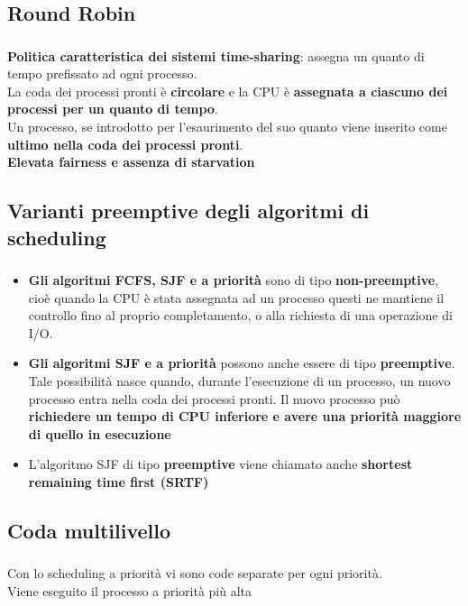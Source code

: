 \documentclass{beamer}
\newenvironment{mainframe}{
	\begin{frame}
		\frametitle{\insertsubsection}
		\framesubtitle{\insertsection}
	}{
	\end{frame}
}
\begin{document}
\subsection{Round Robin}
\begin{mainframe}
	\textbf{Politica caratteristica dei sistemi \textbf{time-sharing}}: assegna un quanto di tempo prefissato ad ogni processo.\\
	La coda dei processi pronti è \textbf{circolare} e la CPU è \textbf{assegnata a ciascuno dei processi per un quanto di tempo}.\\
	Un processo, se introdotto per l'esaurimento del suo quanto viene inserito come \textbf{ultimo nella coda dei processi pronti}.\\
	\textbf{Elevata fairness e assenza di starvation}
\end{mainframe}
\subsection{Varianti preemptive degli algoritmi di scheduling}
\begin{mainframe}
	\begin{itemize}
		\item \textbf{Gli algoritmi FCFS, SJF e a priorità} sono di tipo \textbf{non-preemptive}, cioè quando la CPU è stata assegnata ad un processo questi ne mantiene il controllo fino al proprio completamento, o alla richiesta di una operazione di I/O.
		\item \textbf{Gli algoritmi SJF e a priorità} possono anche essere di tipo \textbf{preemptive}. Tale possibilità nasce quando, durante l'esecuzione di un processo, un nuovo processo entra nella coda dei processi pronti. Il nuovo processo può \textbf{richiedere un tempo di CPU inferiore e avere una priorità maggiore di quello in esecuzione}
		\item L'algoritmo SJF di tipo \textbf{preemptive} viene chiamato anche \textbf{shortest remaining time first (SRTF)}
	\end{itemize}
\end{mainframe}
\subsection{Coda multilivello}
\begin{mainframe}
	Con lo scheduling a priorità vi sono code separate per ogni priorità.\\
	Viene eseguito il processo a priorità più alta
\end{mainframe}
\end{document}
